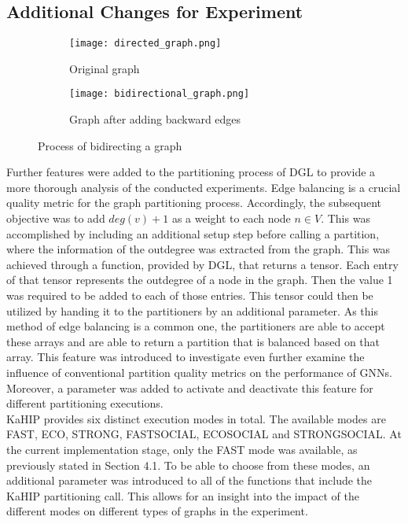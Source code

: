 \documentclass[acmsmall,nonacm,screen,review]{acmart}
\begin{document}
\subsection{Additional Changes for Experiment}
\begin{figure}[bt!]
     \centering
     \begin{subfigure}[b]{0.45\textwidth}
         \centering
         \texttt{[image: directed\_graph.png]}
         \caption{Original graph}
         \label{uni}
     \end{subfigure}
     \hfill
     \begin{subfigure}[b]{0.45\textwidth}
         \centering
         \texttt{[image: bidirectional\_graph.png]}
         \caption{Graph after adding backward edges}
         \label{bi}
     \end{subfigure}
     \caption{Process of bidirecting a graph}
     \label{bidirecting}
\end{figure}
Further features were added to the partitioning process of DGL to provide a more thorough analysis of the conducted experiments. Edge balancing is a crucial quality metric for the graph partitioning process. Accordingly, the subsequent objective was to add $deg(v) + 1$ as a weight to each node $n \in V$. This was accomplished by including an additional setup step before calling a partition, where the information of the outdegree was extracted from the graph. This was achieved through a function, provided by DGL, that returns a tensor. Each entry of that tensor represents the outdegree of a node in the graph. Then the value 1 was required to be added to each of those entries. This tensor could then be utilized by handing it to the partitioners by an additional parameter. As this method of edge balancing is a common one, the partitioners are able to accept these arrays and are able to return a partition that is balanced based on that array. This feature was introduced to investigate even further examine the influence of conventional partition quality metrics on the performance of GNNs. Moreover, a parameter was added to activate and deactivate this feature for different partitioning executions.  \\
KaHIP provides six distinct execution modes in total. The available modes are FAST, ECO, STRONG, FASTSOCIAL, ECOSOCIAL and STRONGSOCIAL.  At the current implementation stage, only the FAST mode was available, as previously stated in Section 4.1. To be able to choose from these modes, an additional parameter was introduced to all of the functions that include the KaHIP partitioning call. This allows for an insight into the impact of the different modes on different types of graphs in the experiment.
\end{document}

